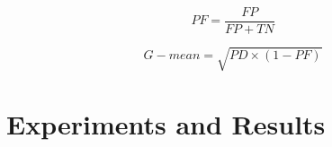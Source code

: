 \documentclass[runningheads,a4paper]{llncs}
\begin{document}
\begin{equation}
PF=\frac{FP}{FP+TN}
\label{PF}
\end{equation}

\begin{equation}
G-mean=\sqrt{PD \times (1-PF)}
\label{gmean}
\end{equation}




\section{Experiments and Results}
\label{experiments}



 
\end{document}
